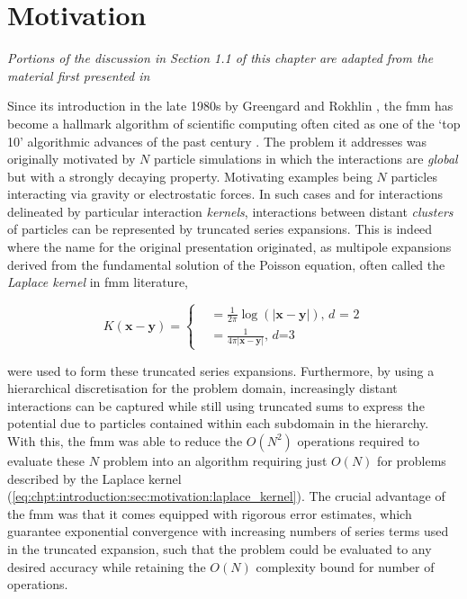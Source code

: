 \section{Motivation}\label{chpt:introduction:sec:motivation}


\begin{center}
    \textit{Portions of the discussion in Section 1.1 of this chapter are adapted from the material first presented in \cite{kailasa2024m2ltranslationoperatorskernel} }
\end{center}


Since its introduction in the late 1980s by Greengard and Rokhlin \cite{greengard1987fast}, the \acrfull{fmm} has become a hallmark algorithm of scientific computing often cited as one of the `top 10' algorithmic advances of the past century \cite{cipra2000best}. The problem it addresses was originally motivated by $N$ particle simulations in which the interactions are \textit{global} but with a strongly decaying property. Motivating examples being $N$ particles interacting via gravity or electrostatic forces. In such cases and for interactions delineated by particular interaction \textit{kernels}, interactions between distant \textit{clusters} of particles can be represented by truncated series expansions. This is indeed where the name for the original presentation originated, as multipole expansions derived from the fundamental solution of the Poisson equation, often called the \textit{Laplace kernel} in \acrshort{fmm} literature,


\begin{equation}
    K(\mathbf{x-y}) =  \begin{cases}
        &= \frac{1}{2\pi} \log(|\mathbf{x-y}|) \text{, $d$ = 2} \\
        &= \frac{1}{4\pi | \mathbf{x-y}|} \text{, $d$=3 }
    \end{cases}
    \label{eq:chpt:introduction:sec:motivation:laplace_kernel}
\end{equation}


were used to form these truncated series expansions. Furthermore, by using a hierarchical discretisation for the problem domain, increasingly distant interactions can be captured while still using truncated sums to express the potential due to particles contained within each subdomain in the hierarchy. With this, the \acrshort{fmm} was able to reduce the $O(N^2)$ operations required to evaluate these $N$ problem into an algorithm requiring just $O(N)$ for problems described by the Laplace kernel (\ref{eq:chpt:introduction:sec:motivation:laplace_kernel}). The crucial advantage of the \acrshort{fmm} was that it comes equipped with rigorous error estimates, which guarantee exponential convergence with increasing numbers of series terms used in the truncated expansion, such that the problem could be evaluated to any desired accuracy while retaining the $O(N)$ complexity bound for number of operations.

